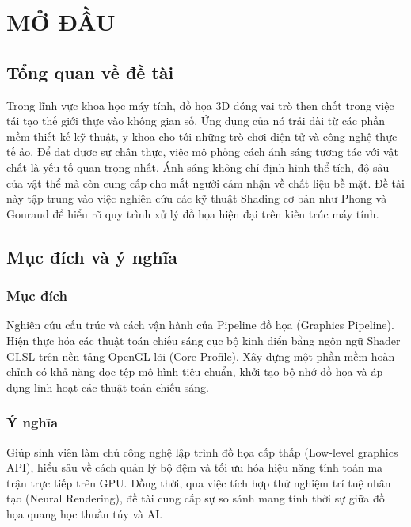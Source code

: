 \documentclass[13pt, a4paper]{extarticle}
\begin{document}
\newpage
{}
\section*{MỞ ĐẦU}

\subsection*{Tổng quan về đề tài}
Trong lĩnh vực khoa học máy tính, đồ họa 3D đóng vai trò then chốt trong việc tái tạo thế giới thực vào không gian số. Ứng dụng của nó trải dài từ các phần mềm thiết kế kỹ thuật, y khoa cho tới những trò chơi điện tử và công nghệ thực tế ảo. Để đạt được sự chân thực, việc mô phỏng cách ánh sáng tương tác với vật chất là yếu tố quan trọng nhất. Ánh sáng không chỉ định hình thể tích, độ sâu của vật thể mà còn cung cấp cho mắt người cảm nhận về chất liệu bề mặt. Đề tài này tập trung vào việc nghiên cứu các kỹ thuật Shading cơ bản như Phong và Gouraud để hiểu rõ quy trình xử lý đồ họa hiện đại trên kiến trúc máy tính.

\subsection*{Mục đích và ý nghĩa}
\subsubsection*{Mục đích}
Nghiên cứu cấu trúc và cách vận hành của Pipeline đồ họa (Graphics Pipeline). Hiện thực hóa các thuật toán chiếu sáng cục bộ kinh điển bằng ngôn ngữ Shader GLSL trên nền tảng OpenGL lõi (Core Profile). Xây dựng một phần mềm hoàn chỉnh có khả năng đọc tệp mô hình tiêu chuẩn, khởi tạo bộ nhớ đồ họa và áp dụng linh hoạt các thuật toán chiếu sáng.

\subsubsection*{Ý nghĩa}
Giúp sinh viên làm chủ công nghệ lập trình đồ họa cấp thấp (Low-level graphics API), hiểu sâu về cách quản lý bộ đệm và tối ưu hóa hiệu năng tính toán ma trận trực tiếp trên GPU. Đồng thời, qua việc tích hợp thử nghiệm trí tuệ nhân tạo (Neural Rendering), đề tài cung cấp sự so sánh mang tính thời sự giữa đồ họa quang học thuần túy và AI.
\end{document}
